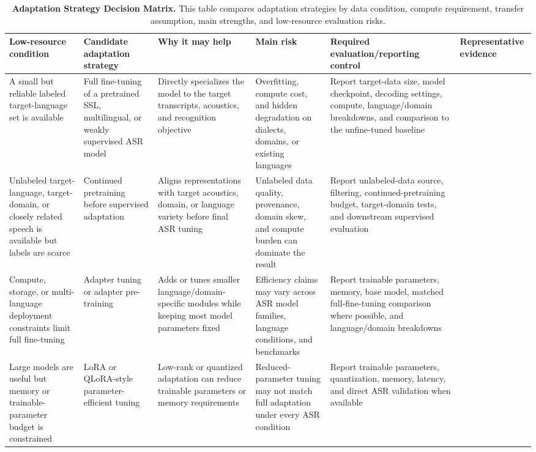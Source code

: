 \documentclass[pdflatex,sn-basic,iicol]{sn-jnl}
\theoremstyle{thmstyleone}
\theoremstyle{thmstyletwo}
\theoremstyle{thmstylethree}
\begin{document}
\begin{table}[htbp]
\setcounter{table}{2}
\footnotesize
\centering
\caption{\textbf{Adaptation Strategy Decision Matrix.} This table compares adaptation strategies by data condition, compute requirement, transfer assumption, main strengths, and low-resource evaluation risks.}
\label{tab:3}
\begin{tabularx}{\textwidth}{YYYYYY}
\toprule
\textbf{Low-resource condition} & \textbf{Candidate adaptation strategy} & \textbf{Why it may help} & \textbf{Main risk} & \textbf{Required evaluation/reporting control} & \textbf{Representative evidence} \\
\midrule
A small but reliable labeled target-language set is available & Full fine-tuning of a pretrained SSL, multilingual, or weakly supervised ASR model & Directly specializes the model to the target transcripts, acoustics, and recognition objective & Overfitting, compute cost, and hidden degradation on dialects, domains, or existing languages & Report target-data size, model checkpoint, decoding settings, compute, language/domain breakdowns, and comparison to the unfine-tuned baseline & \citep{babu22_interspeech,pmlr-v202-radford23a,pratap2024mms} \\
Unlabeled target-language, target-domain, or closely related speech is available but labels are scarce & Continued pretraining before supervised adaptation & Aligns representations with target acoustics, domain, or language variety before final ASR tuning & Unlabeled data quality, provenance, domain skew, and compute burden can dominate the result & Report unlabeled-data source, filtering, continued-pretraining budget, target-domain tests, and downstream supervised evaluation & \citep{getman24_interspeech,tian25b_interspeech} \\
Compute, storage, or multi-language deployment constraints limit full fine-tuning & Adapter tuning or adapter pre-training & Adds or tunes smaller language/domain-specific modules while keeping most model parameters fixed & Efficiency claims may vary across ASR model families, language conditions, and benchmarks & Report trainable parameters, memory, base model, matched full-fine-tuning comparison where possible, and language/domain breakdowns & \citep{pmlr-v97-houlsby19a,udupa24_interspeech} \\
Large models are useful but memory or trainable-parameter budget is constrained & LoRA or QLoRA-style parameter-efficient tuning & Low-rank or quantized adaptation can reduce trainable parameters or memory requirements & Reduced-parameter tuning may not match full adaptation under every ASR condition & Report trainable parameters, quantization, memory, latency, and direct ASR validation when available & \citep{hu2022lora,dettmers2023qlora} \\

\end{tabularx}
\end{table}
\end{document}
